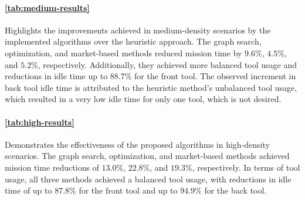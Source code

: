 \paragraph{\autoref{tab:medium-results}} Highlights the improvements achieved in medium-density scenarios by the implemented algorithms over the heuristic approach. The graph search, optimization, and market-based methods reduced mission time by $9.6\%$, $4.5\%$, and $5.2\%$, respectively. Additionally, they achieved more balanced tool usage and reductions in idle time up to $88.7\%$ for the front tool. The observed increment in back tool idle time is attributed to the heuristic method’s unbalanced tool usage, which resulted in a very low idle time for only one tool, which is not desired.

\paragraph{\autoref{tab:high-results}} Demonstrates the effectiveness of the proposed algorithms in high-density scenarios. The graph search, optimization, and market-based methods achieved mission time reductions of $13.0\%$, $22.8\%$, and $19.3\%$, respectively. In terms of tool usage, all three methods achieved a balanced tool usage, with reductions in idle time of up to $87.8\%$ for the front tool and up to $94.9\%$ for the back tool.